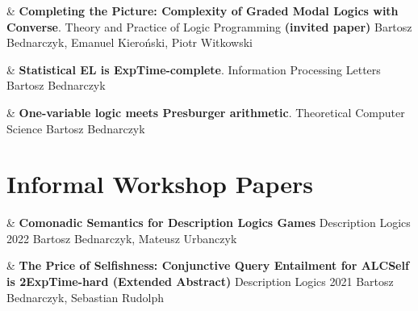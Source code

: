 \documentclass[10pt,a4paper]{article}
\begin{document}
\begin{EntriesTableYear}
  &
  \textbf{Completing the Picture: Complexity of Graded Modal Logics with Converse}.
  \newline
  Theory and Practice of Logic Programming \textbf{(invited paper)}
  \newline
 Bartosz Bednarczyk, Emanuel Kieroński, Piotr Witkowski
  \\
\end{EntriesTableYear}

\begin{EntriesTableYear}
  &
  \textbf{Statistical EL is ExpTime-complete}.
  \newline
  Information Processing Letters
  \newline
 Bartosz Bednarczyk
  \\
\end{EntriesTableYear}

\begin{EntriesTableYear}
  &
  \textbf{One-variable logic meets Presburger arithmetic}.
  \newline
  Theoretical Computer Science
  \newline
 Bartosz Bednarczyk
  \\
\end{EntriesTableYear}



\section{Informal Workshop Papers}

\begin{EntriesTableYear}
  &
  \textbf{Comonadic Semantics for Description Logics Games}
  \newline
  Description Logics 2022
  \newline
  Bartosz Bednarczyk, Mateusz Urbanczyk
  \\
\end{EntriesTableYear}

\begin{EntriesTableYear}
  &
  \textbf{The Price of Selfishness: Conjunctive Query Entailment for ALCSelf is 2ExpTime-hard (Extended Abstract)}
  \newline
  Description Logics 2021
  \newline
 Bartosz Bednarczyk, Sebastian Rudolph
  \\
\end{EntriesTableYear}
\end{document}
